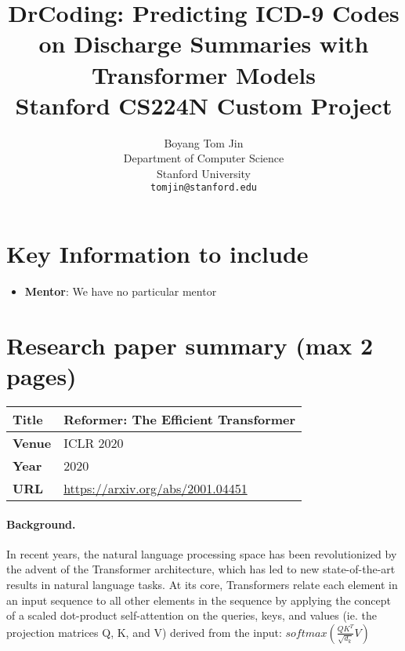 \documentclass{article}
\title{
  DrCoding: Predicting ICD-9 Codes on Discharge Summaries with Transformer Models \\
  \vspace{1em}
  \small{\normalfont Stanford CS224N Custom Project}
}
\author{
  Boyang Tom Jin \\
  Department of Computer Science \\
  Stanford University \\
  \texttt{tomjin@stanford.edu} \\
}
\begin{document}
\maketitle



\section{Key Information to include}
\begin{itemize}
	\item
		\textbf{Mentor}: We have no particular mentor
\end{itemize}


\section{Research paper summary (max 2 pages)}

\begin{table}[h]
    \centering
    \begin{tabular}{ll}
        \toprule
        \textbf{Title} & Reformer: The Efficient Transformer \cite{kitaev2020reformer} \\
        \midrule
        \textbf{Venue} & ICLR 2020 \\
        \textbf{Year}  & 2020 \\
        \textbf{URL}   & \url{https://arxiv.org/abs/2001.04451} \\
        \bottomrule
    \end{tabular}
    \vspace{1em}
\end{table}

\paragraph{Background.}
In recent years, the natural language processing space has been revolutionized by the advent of the Transformer architecture, which has led to new state-of-the-art results in natural language tasks. At its core, Transformers relate each element in an input sequence to all other elements in the sequence by applying the concept of a scaled dot-product self-attention on the queries, keys, and values (ie. the projection matrices Q, K, and V) derived from the input: $softmax(\frac{QK^T}{\sqrt{d_k}}V)$
\end{document}
